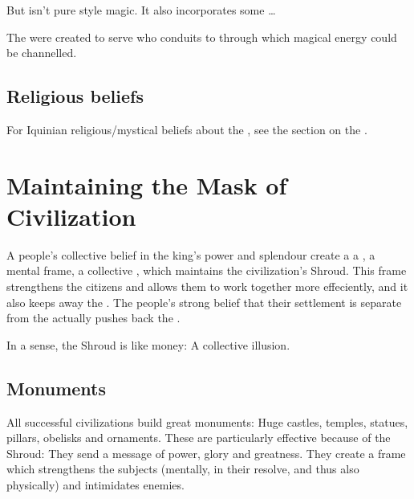But \itzach{} isn't pure \Erebean{} style magic. 
It also incorporates some \ldots{}

The \qliphoth were created to serve who conduits to \Erebos{} through which magical energy could be channelled. 









\subsection{Religious beliefs}
For Iquinian religious/mystical beliefs about the \qliphoth, see the section on the . 













\section{Maintaining the Mask of Civilization}


A people's collective belief in the king's power and splendour create a a , a mental frame, a collective \vertex, which maintains the civilization's Shroud. 
This frame strengthens the citizens and allows them to work together more effeciently, and it also keeps away the \Wylde{}. 
The people's strong belief that their settlement is separate from the \Wylde{} actually pushes back the \Wylde{}.

In a sense, the Shroud is like money: 
A collective illusion. 









\subsection{Monuments}
All successful civilizations build great monuments: Huge castles, temples, statues, pillars, obelisks and ornaments. These are particularly effective because of the Shroud: They send a message of power, glory and greatness. They create a frame which strengthens the subjects (mentally, in their resolve, and thus also physically) and intimidates enemies. 


